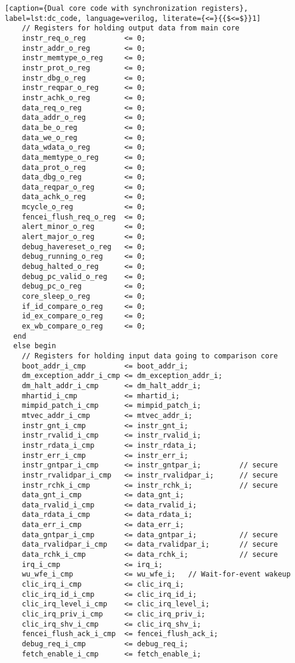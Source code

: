 \begin{lstlisting}[caption={Dual core code with synchronization registers}, label=lst:dc_code, language=verilog, literate={<=}{{$<=$}}1]
    // Registers for holding output data from main core 
    instr_req_o_reg         <= 0;
    instr_addr_o_reg        <= 0;
    instr_memtype_o_reg     <= 0;
    instr_prot_o_reg        <= 0;
    instr_dbg_o_reg         <= 0;
    instr_reqpar_o_reg      <= 0;
    instr_achk_o_reg        <= 0;
    data_req_o_reg          <= 0;  
    data_addr_o_reg         <= 0;
    data_be_o_reg           <= 0;
    data_we_o_reg           <= 0;
    data_wdata_o_reg        <= 0;
    data_memtype_o_reg      <= 0;
    data_prot_o_reg         <= 0;
    data_dbg_o_reg          <= 0;
    data_reqpar_o_reg       <= 0;
    data_achk_o_reg         <= 0;
    mcycle_o_reg            <= 0;
    fencei_flush_req_o_reg  <= 0;
    alert_minor_o_reg       <= 0;
    alert_major_o_reg       <= 0;
    debug_havereset_o_reg   <= 0;
    debug_running_o_reg     <= 0;
    debug_halted_o_reg      <= 0;
    debug_pc_valid_o_reg    <= 0;
    debug_pc_o_reg          <= 0;
    core_sleep_o_reg        <= 0;
    if_id_compare_o_reg     <= 0;
    id_ex_compare_o_reg     <= 0;
    ex_wb_compare_o_reg     <= 0;
  end
  else begin
    // Registers for holding input data going to comparison core
    boot_addr_i_cmp         <= boot_addr_i;
    dm_exception_addr_i_cmp <= dm_exception_addr_i;
    dm_halt_addr_i_cmp      <= dm_halt_addr_i;
    mhartid_i_cmp           <= mhartid_i;
    mimpid_patch_i_cmp      <= mimpid_patch_i;
    mtvec_addr_i_cmp        <= mtvec_addr_i;
    instr_gnt_i_cmp         <= instr_gnt_i;
    instr_rvalid_i_cmp      <= instr_rvalid_i;
    instr_rdata_i_cmp       <= instr_rdata_i;
    instr_err_i_cmp         <= instr_err_i;
    instr_gntpar_i_cmp      <= instr_gntpar_i;         // secure
    instr_rvalidpar_i_cmp   <= instr_rvalidpar_i;      // secure
    instr_rchk_i_cmp        <= instr_rchk_i;           // secure
    data_gnt_i_cmp          <= data_gnt_i;
    data_rvalid_i_cmp       <= data_rvalid_i;
    data_rdata_i_cmp        <= data_rdata_i;
    data_err_i_cmp          <= data_err_i;
    data_gntpar_i_cmp       <= data_gntpar_i;          // secure
    data_rvalidpar_i_cmp    <= data_rvalidpar_i;       // secure
    data_rchk_i_cmp         <= data_rchk_i;            // secure
    irq_i_cmp               <= irq_i;
    wu_wfe_i_cmp            <= wu_wfe_i;   // Wait-for-event wakeup
    clic_irq_i_cmp          <= clic_irq_i;
    clic_irq_id_i_cmp       <= clic_irq_id_i;
    clic_irq_level_i_cmp    <= clic_irq_level_i;
    clic_irq_priv_i_cmp     <= clic_irq_priv_i;
    clic_irq_shv_i_cmp      <= clic_irq_shv_i;
    fencei_flush_ack_i_cmp  <= fencei_flush_ack_i;
    debug_req_i_cmp         <= debug_req_i;
    fetch_enable_i_cmp      <= fetch_enable_i;
 

\end{lstlisting}
